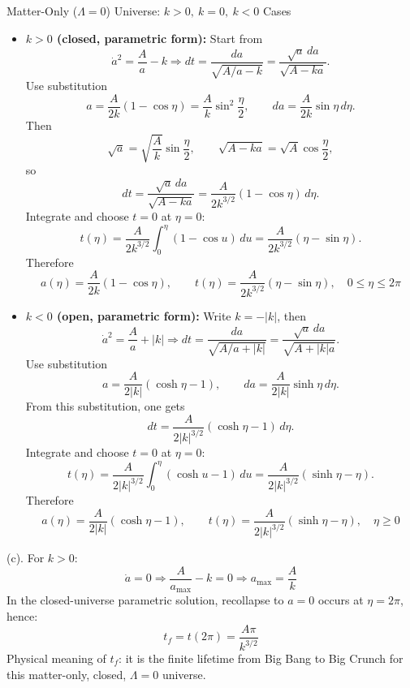 \begin{example}{Matter-Only ($\Lambda=0$) Universe: $k>0,\ k=0,\ k<0$ Cases}{}
\begin{itemize}
        \item \textbf{$k>0$ (closed, parametric form):}
        Start from
        \[
            \dot{a}^2 = \frac{A}{a} - k
            \Rightarrow
            dt = \frac{da}{\sqrt{A/a-k}} = \frac{\sqrt{a}\,da}{\sqrt{A-ka}}.
        \]
        Use substitution
        \[
            a = \frac{A}{2k}(1-\cos\eta)=\frac{A}{k}\sin^2\frac{\eta}{2},
            \qquad
            da = \frac{A}{2k}\sin\eta\,d\eta.
        \]
        Then
        \[
            \sqrt{a}=\sqrt{\frac{A}{k}}\sin\frac{\eta}{2},
            \qquad
            \sqrt{A-ka}=\sqrt{A}\cos\frac{\eta}{2},
        \]
        so
        \[
            dt
            = \frac{\sqrt{a}\,da}{\sqrt{A-ka}}
            = \frac{A}{2k^{3/2}}(1-\cos\eta)\,d\eta.
        \]
        Integrate and choose $t=0$ at $\eta=0$:
        \[
            t(\eta)=\frac{A}{2k^{3/2}}\int_0^{\eta}(1-\cos u)\,du
            = \frac{A}{2k^{3/2}}(\eta-\sin\eta).
        \]
        Therefore
        \[
            a(\eta) = \frac{A}{2k}(1-\cos\eta), \qquad
            t(\eta) = \frac{A}{2k^{3/2}}(\eta-\sin\eta), \quad 0\le\eta\le2\pi
        \]

        \item \textbf{$k<0$ (open, parametric form):}
        Write $k=-|k|$, then
        \[
            \dot{a}^2 = \frac{A}{a} + |k|
            \Rightarrow
            dt = \frac{da}{\sqrt{A/a+|k|}} = \frac{\sqrt{a}\,da}{\sqrt{A+|k|a}}.
        \]
        Use substitution
        \[
            a = \frac{A}{2|k|}(\cosh\eta-1),
            \qquad
            da = \frac{A}{2|k|}\sinh\eta\,d\eta.
        \]
        From this substitution, one gets
        \[
            dt = \frac{A}{2|k|^{3/2}}(\cosh\eta-1)\,d\eta.
        \]
        Integrate and choose $t=0$ at $\eta=0$:
        \[
            t(\eta)=\frac{A}{2|k|^{3/2}}\int_0^{\eta}(\cosh u-1)\,du
            = \frac{A}{2|k|^{3/2}}(\sinh\eta-\eta).
        \]
        Therefore
        \[
            a(\eta) = \frac{A}{2|k|}(\cosh\eta-1), \qquad
            t(\eta) = \frac{A}{2|k|^{3/2}}(\sinh\eta-\eta), \quad \eta\ge0
        \]
    \end{itemize}

    (c). For $k>0$:
    \[
        \dot{a}=0 \Rightarrow \frac{A}{a_{\max}}-k=0 \Rightarrow a_{\max}=\frac{A}{k}
    \]
    In the closed-universe parametric solution, recollapse to $a=0$ occurs at $\eta=2\pi$, hence:
    \[
        t_f = t(2\pi) = \frac{A\pi}{k^{3/2}}
    \]
    Physical meaning of $t_f$: it is the finite lifetime from Big Bang to Big Crunch for this matter-only, closed, $\Lambda=0$ universe.
\end{example}




